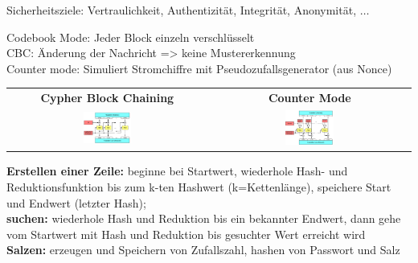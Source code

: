 Sicherheitsziele: Vertraulichkeit, Authentizität, Integrität, Anonymität, $\dots$


Codebook Mode: Jeder Block einzeln verschlüsselt\\
CBC: Änderung der Nachricht => keine Mustererkennung\\
Counter mode: Simuliert Stromchiffre mit Pseudozufallsgenerator (aus Nonce)\\
\begin{tabular}{cc}
\textbf{Cypher Block Chaining} & \textbf{Counter Mode}\\
\includegraphics[width=0.25\textwidth]{CBC}   &  \includegraphics[width=0.25\textwidth]{Counter}\\
\end{tabular}




\textbf{Erstellen einer Zeile:} beginne bei Startwert, wiederhole Hash- und Reduktionsfunktion bis zum k-ten Hashwert (k=Kettenlänge), speichere Start und Endwert (letzter Hash);\\
\textbf{suchen:} wiederhole Hash und Reduktion bis ein bekannter Endwert, dann gehe vom Startwert mit Hash und Reduktion bis gesuchter Wert erreicht wird\\
\textbf{Salzen:} erzeugen und Speichern von Zufallszahl, hashen von Passwort und Salz
